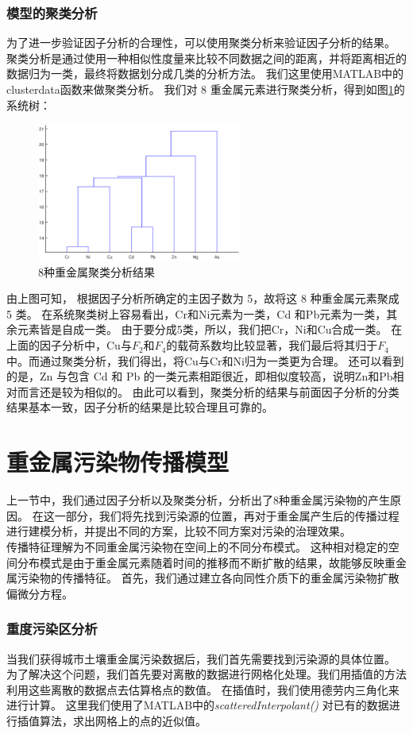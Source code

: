 \documentclass[a4paper]{article}
\begin{document}
\section{模型的聚类分析}
为了进一步验证因子分析的合理性，可以使用聚类分析来验证因子分析的结果。
聚类分析是通过使用一种相似性度量来比较不同数据之间的距离，并将距离相近的数据归为一类，最终将数据划分成几类的分析方法。
我们这里使用MATLAB中的clusterdata函数来做聚类分析。
我们对 8 重金属元素进行聚类分析，得到如图\ref{fig:cluster}的系统树：
\begin{figure}
    \includegraphics[width=0.6\textwidth,bb=80 420 500 720]{pictures/cluster.eps}
    \caption{8种重金属聚类分析结果}
    \label{fig:cluster}
\end{figure}
由上图可知， 根据因子分析所确定的主因子数为 5，故将这 8 种重金属元素聚成 5 类。
在系统聚类树上容易看出，Cr和Ni元素为一类，Cd 和Pb元素为一类，其余元素皆是自成一类。
由于要分成5类，所以，我们把Cr，Ni和Cu合成一类。
在上面的因子分析中，Cu与$F_2$和$F_4$的载荷系数均比较显著，我们最后将其归于$F_4$中。而通过聚类分析，我们得出，将Cu与Cr和Ni归为一类更为合理。
还可以看到的是，Zn 与包含 Cd 和 Pb 的一类元素相距很近，即相似度较高，说明Zn和Pb相对而言还是较为相似的。
由此可以看到，聚类分析的结果与前面因子分析的分类结果基本一致，因子分析的结果是比较合理且可靠的。


\part{重金属污染物传播模型}
上一节中，我们通过因子分析以及聚类分析，分析出了8种重金属污染物的产生原因。
在这一部分，我们将先找到污染源的位置，再对于重金属产生后的传播过程进行建模分析，并提出不同的方案，比较不同方案对污染的治理效果。\\
\indent 传播特征理解为不同重金属污染物在空间上的不同分布模式。
这种相对稳定的空间分布模式是由于重金属元素随着时间的推移而不断扩散的结果，故能够反映重金属污染物的传播特征。
首先，我们通过建立各向同性介质下的重金属污染物扩散偏微分方程。
\section{重度污染区分析}
当我们获得城市土壤重金属污染数据后，我们首先需要找到污染源的具体位置。\\
\indent 为了解决这个问题，我们首先要对离散的数据进行网格化处理。我们用插值的方法利用这些离散的数据点去估算格点的数值。
在插值时，我们使用德劳内三角化来进行计算。
这里我们使用了MATLAB中的\emph{scatteredInterpolant()} \cite{journals/jei/Amidror02}对已有的数据进行插值算法，求出网格上的点的近似值。
\end{document}
